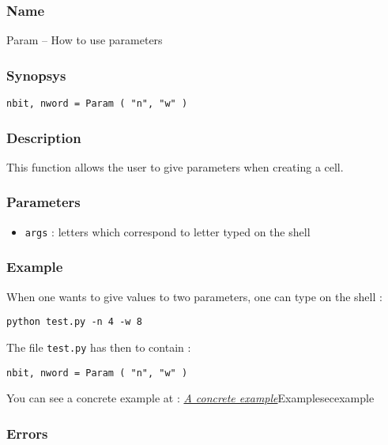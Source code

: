 \subsubsection{Name}

Param -- How to use parameters

\subsubsection{Synopsys}

\begin{verbatim}
nbit, nword = Param ( "n", "w" )
\end{verbatim}

\subsubsection{Description}

This function allows the user to give parameters when creating a cell.

\subsubsection{Parameters}

\begin{itemize}
    \item \verb-args- : letters which correspond to letter typed on the shell
\end{itemize}
    
\subsubsection{Example}

When one wants to give values to two parameters, one can type on the shell :
\begin{verbatim}
python test.py -n 4 -w 8
\end{verbatim}

The file \verb-test.py- has then to contain :
\begin{verbatim}
nbit, nword = Param ( "n", "w" )
\end{verbatim}

You can see a concrete example at : \hyperref[ref]{\emph{A concrete example}}{}{Example}{secexample}
    
\subsubsection{Errors}
    
